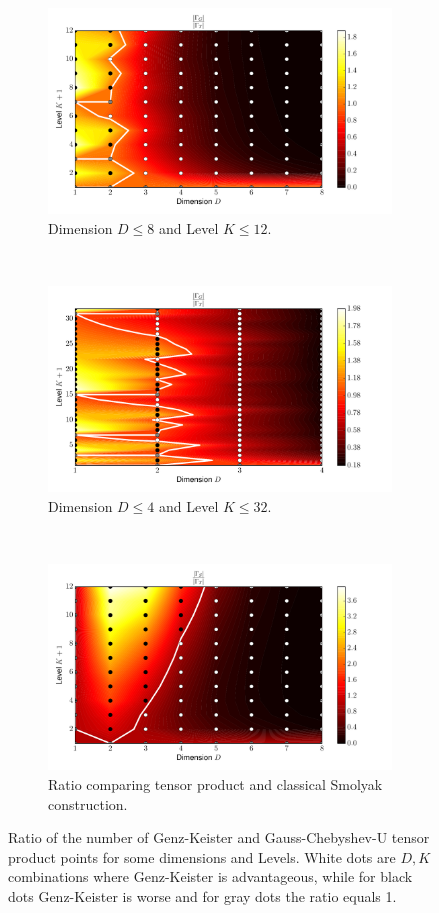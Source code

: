 \documentclass[a4paper,10pt]{article}
\begin{document}
\begin{figure}
  \begin{subfigure}[b]{\linewidth}
    \centering
    \includegraphics[width=0.8\linewidth]{./img/gk_chebyshevu_ratio.pdf}
    \caption{Dimension $D \leq 8$ and Level $K \leq 12$.}
    \label{fig:gk_chebyshevu_ratio}
  \end{subfigure} \\
  \begin{subfigure}[b]{\linewidth}
    \centering
    \includegraphics[width=0.8\linewidth]{./img/gk_chebyshevu_ratio_large.pdf}
    \caption{Dimension $D \leq 4$ and Level $K \leq 32$.}
    \label{fig:gk_chebyshevu_ratio_large}
  \end{subfigure} \\
  \begin{subfigure}[b]{\linewidth}
    \centering
    \includegraphics[width=0.8\linewidth]{./img/smol_chebyshevu_ratio.pdf}
    \caption{Ratio comparing tensor product and classical Smolyak construction.}
    \label{fig:smol_chebyshevu_ratio}
  \end{subfigure}
  \caption{Ratio of the number of Genz-Keister and Gauss-Chebyshev-U tensor product
  points for some dimensions and Levels.
  White dots are $D,K$ combinations where Genz-Keister is advantageous,
  while for black dots Genz-Keister is worse and for gray dots the ratio equals 1.}
\end{figure}
\end{document}
